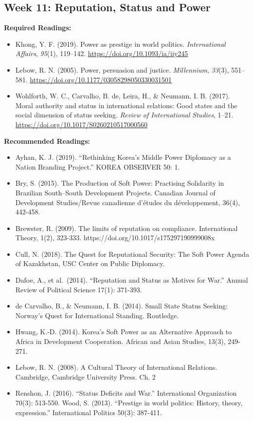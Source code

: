 \documentclass[
  letterpaper,
  DIV=11,
  numbers=noendperiod]{scrartcl}
\providecommand{\tightlist}{%
  \setlength{\itemsep}{0pt}\setlength{\parskip}{0pt}}\usepackage{longtable,booktabs,array}
\begin{document}
\hypertarget{week-11-reputation-status-and-power}{%
\subsection*{Week 11: Reputation, Status and
Power}\label{week-11-reputation-status-and-power}}

\textbf{Required Readings:}

\begin{itemize}
\tightlist
\item
  Khong, Y. F. (2019). Power as prestige in world politics.
  \emph{International Affairs}, \emph{95}(1), 119--142.
  \url{https://doi.org/10.1093/ia/iiy245}
\item
  Lebow, R. N. (2005). Power, persuasion and justice. \emph{Millennium},
  \emph{33}(3), 551--581.
  \url{https://doi.org/10.1177/03058298050330031501}
\item
  Wohlforth, W. C., Carvalho, B. de, Leira, H., \& Neumann, I. B.
  (2017). Moral authority and status in international relations: Good
  states and the social dimension of status seeking. \emph{Review of
  International Studies}, 1--21.
  \url{https://doi.org/10.1017/S0260210517000560}
\end{itemize}

\textbf{Recommended Readings:}

\begin{itemize}
\tightlist
\item
  Ayhan, K. J. (2019). ``Rethinking Korea's Middle Power Diplomacy as a
  Nation Branding Project.'' KOREA OBSERVER 50: 1.
\item
  Bry, S. (2015). The Production of Soft Power: Practising Solidarity in
  Brazilian South--South Development Projects. Canadian Journal of
  Development Studies/Revue canadienne d'études du développement, 36(4),
  442-458.
\item
  Brewster, R. (2009). The limits of reputation on compliance.
  International Theory, 1(2), 323-333.
  https://doi.org/10.1017/s175297190999008x
\item
  Cull, N. (2018). The Quest for Reputational Security: The Soft Power
  Agenda of Kazakhstan, USC Center on Public Diplomacy.
\item
  Dafoe, A., et al.~(2014). ``Reputation and Status as Motives for
  War.'' Annual Review of Political Science 17(1): 371-393.
\item
  de Carvalho, B., \& Neumann, I. B. (2014). Small State Status Seeking:
  Norway's Quest for International Standing. Routledge.
\item
  Hwang, K.-D. (2014). Korea's Soft Power as an Alternative Approach to
  Africa in Development Cooperation. African and Asian Studies, 13(3),
  249-271.
\item
  Lebow, R. N. (2008). A Cultural Theory of International Relations.
  Cambridge, Cambridge University Press. Ch. 2
\item
  Renshon, J. (2016). ``Status Deficits and War.'' International
  Organization 70(3): 513-550. Wood, S. (2013). ``Prestige in world
  politics: History, theory, expression.'' International Politics 50(3):
  387-411.
\end{itemize}
\end{document}
